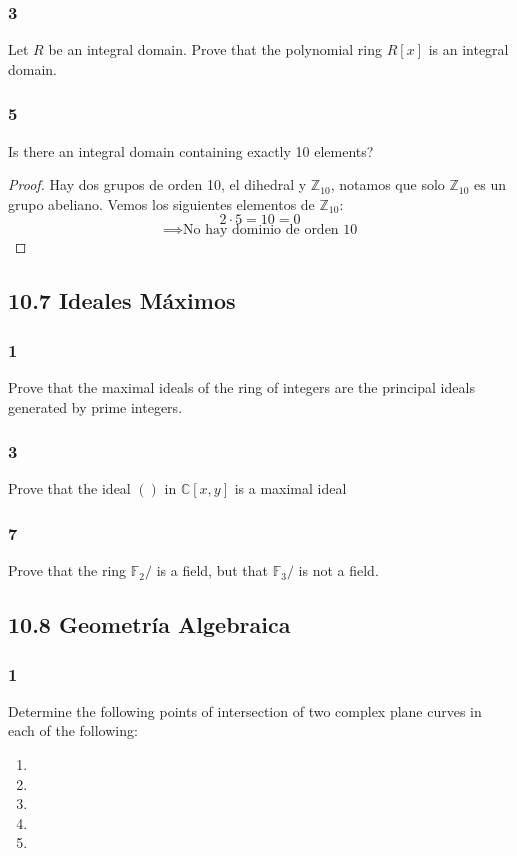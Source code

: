 \documentclass[11pt]{article}
\newcommand{\set}[1]{\mathbb{#1}}
\theoremstyle{definition}
\begin{document}
        \subsubsection{3}
        Let $R$ be an integral domain. Prove that the polynomial ring $R[x]$ is an integral domain.

        \subsubsection{5}
        Is there an integral domain containing exactly 10 elements?
        \begin{proof}
            Hay dos grupos de orden 10, el dihedral y $\set{Z}_{10}$, notamos que solo $\set{Z}_{10}$ es un grupo abeliano. Vemos los siguientes elementos de $\set{Z}_{10}$:
            \[2\cdot 5=10=0\]
            \[\implies \textrm{No hay dominio de orden 10}\]
        \end{proof}

        \subsection{10.7 Ideales Máximos}
        \subsubsection{1}
        Prove that the maximal ideals of the ring of integers are the principal ideals generated by prime integers.

        \subsubsection{3}
        Prove that the ideal $()$ in $\set{C}[x,y]$ is a maximal ideal

        \subsubsection{7}
        Prove that the ring $\set{F}_2/$ is a field, but that $\set{F}_3/$ is not a field.

        \subsection{10.8 Geometría Algebraica}
        \subsubsection{1}
        Determine the following points of intersection of two complex plane curves in each of the following:
        \begin{enumerate}[label=\textbf{(\alph*)}]
            \item

            \item

            \item

            \item

            \item
        \end{enumerate}
\end{document}
